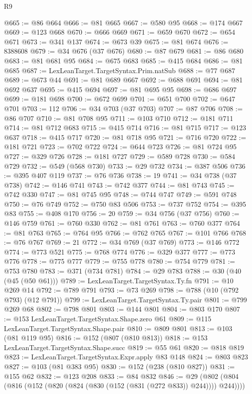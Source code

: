 \begin{lexlean}{R9}
\begin{coremodule}
@665 := @86 @664
@666 := @81 @665
@667 := @580 @95
@668 := @174 @667
@669 := @123 @668
@670 := @666 @669
@671 := @659 @670
@672 := @654 @671
@673 := @341 @137
@674 := @673 @39
@675 := @81 @674
@676 := 8388608
@679 := @34 @676 (@37 @676)
@680 := @87 @679
@681 := @86 @680
@683 := @81 @681 @95
@684 := @675 @683
@685 := @415 @684
@686 := @81 @685
@687 := LexLeanTarget.TargetSyntax.Prim.natSub
@688 := @77 @687
@689 := @673 @44
@691 := @81 @689 @667
@692 := @688 @691
@694 := @81 @692 @637
@695 := @415 @694
@697 := @81 @695 @95
@698 := @686 @697
@699 := @181 @698
@700 := @672 @699
@701 := @651 @700
@702 := @647 @701
@703 := 112
@706 := @34 @703 (@37 @703)
@707 := @87 @706
@708 := @86 @707
@710 := @81 @708 @95
@711 := @103 @710
@712 := @181 @711
@714 := @81 @712 @683
@715 := @415 @714
@716 := @81 @715
@717 := @123 @637
@718 := @415 @717
@720 := @81 @718 @95
@721 := @716 @720
@722 := @181 @721
@723 := @702 @722
@724 := @644 @723
@726 := @81 @724 @95
@727 := @329 @726
@728 := @181 @727
@729 := @589 @728
@730 := @584 @729
@732 := @549 (@568 @730)
@733 := @29 @732
@734 := @387 @506
@736 := @395 @407 @119
@737 := @76 @736
@738 := 19
@741 := @34 @738 (@37 @738)
@742 := @146 @741
@743 := @742 @377
@744 := @81 @743
@745 := @742 @330
@747 := @81 @745 @95
@748 := @744 @747
@749 := @591 @748
@750 := @76 @749
@752 := @750 @83 @506
@753 := @737 @752
@754 := @395 @83
@755 := @408 @170
@756 := 20
@759 := @34 @756 (@37 @756)
@760 := @146 @759
@761 := @760 @330
@762 := @81 @761
@763 := @760 @377
@764 := @81 @763
@765 := @764 @95
@766 := @762 @765
@767 := @101 @766
@768 := @76 @767
@769 := 21
@772 := @34 @769 (@37 @769)
@773 := @146 @772
@774 := @773 @521
@775 := @768 @774
@776 := @329 @377
@777 := @773 @776
@778 := @775 @777
@779 := @755 @778
@780 := @754 @779
@781 := @753 @780
@783 := @371 (@734 @781)
@784 := @29 @783
@788 := @30 (@40 (@45 (@50 @61)))
@789 := LexLeanTarget.TargetSyntax.Ty.fn
@791 := @10 @269 @14
@792 := @789 @791
@793 := @73 @269
@798 := @788 (@10 (@792 @793) (@12 @791))
@799 := LexLeanTarget.TargetSyntax.Ty.pair
@801 := @799 @269 @68
@802 := @798 @801
@803 := @144 @801
@804 := @803 @170
@807 := @153 LexLeanTarget.TargetSyntax.Shape.zero @61
@809 := @115 LexLeanTarget.TargetSyntax.Shape.pair
@810 := @809 @801
@813 := @103 (@81 @119 @95)
@816 := @152 (@807 (@810 @813))
@818 := @153 LexLeanTarget.TargetSyntax.Shape.succ
@819 := @55 @61
@820 := @818 @819
@823 := LexLeanTarget.TargetSyntax.Expr.apply @83 @148
@824 := @803 @823
@827 := @103 (@81 @383 @95)
@830 := @152 (@238 (@810 @827))
@831 := @155 @62
@832 := @123 @208
@833 := @84 @832
@846 := @29 (@802 (@804 (@816 (@152 (@820 (@824 (@830 (@152 (@831 (@272 @833)) @244)))) @244))))

\end{coremodule}
\end{lexlean}
